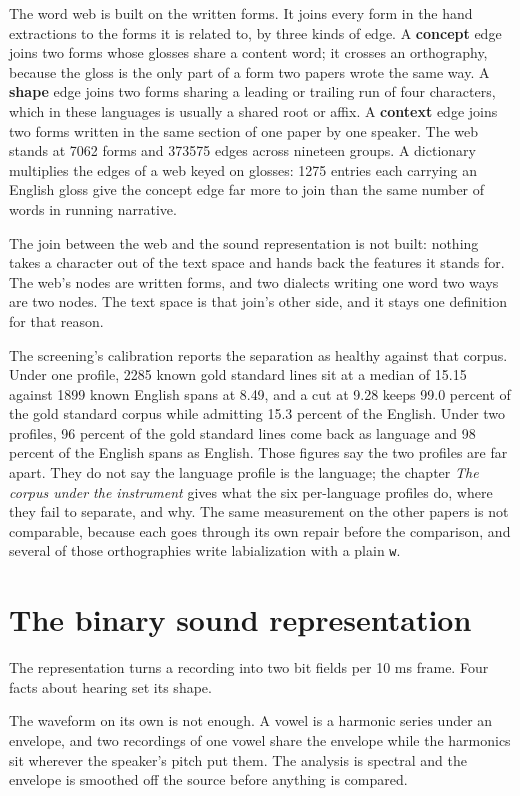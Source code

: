 The word web is built on the written forms. It joins every form in the hand extractions to the forms it is related to, by three kinds of edge. A \textbf{concept} edge joins two forms whose glosses share a content word; it crosses an orthography, because the gloss is the only part of a form two papers wrote the same way. A \textbf{shape} edge joins two forms sharing a leading or trailing run of four characters, which in these languages is usually a shared root or affix. A \textbf{context} edge joins two forms written in the same section of one paper by one speaker. The web stands at 7062 forms and 373575 edges across nineteen groups. A dictionary multiplies the edges of a web keyed on glosses: 1275 entries each carrying an English gloss give the concept edge far more to join than the same number of words in running narrative.

The join between the web and the sound representation is not built: nothing takes a character out of the text space and hands back the features it stands for. The web's nodes are written forms, and two dialects writing one word two ways are two nodes. The text space is that join's other side, and it stays one definition for that reason.

The screening's calibration reports the separation as healthy against that corpus. Under one profile, 2285 known gold standard lines sit at a median of 15.15 against 1899 known English spans at 8.49, and a cut at 9.28 keeps 99.0 percent of the gold standard corpus while admitting 15.3 percent of the English. Under two profiles, 96 percent of the gold standard lines come back as language and 98 percent of the English spans as English. Those figures say the two profiles are far apart. They do not say the language profile is the language; the chapter \emph{The corpus under the instrument} gives what the six per-language profiles do, where they fail to separate, and why. The same measurement on the other papers is not comparable, because each goes through its own repair before the comparison, and several of those orthographies write labialization with a plain \texttt{w}.

\section{The binary sound representation}

The representation turns a recording into two bit fields per 10 ms frame. Four facts about hearing set its shape.

The waveform on its own is not enough. A vowel is a harmonic series under an envelope, and two recordings of one vowel share the envelope while the harmonics sit wherever the speaker's pitch put them. The analysis is spectral and the envelope is smoothed off the source before anything is compared.

